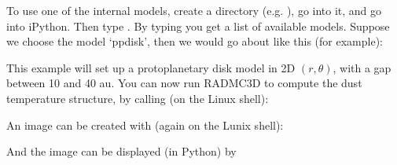 \documentclass[letterpaper,10pt,english]{sphinxmanual}
\begin{document}
To use one of the \sphinxhyphen{}internal models, create a directory
(e.g. ), go into it, and go into iPython. Then type
. By typing  you get a list
of available models. Suppose we choose the model ‘ppdisk’, then we would go
about like this (for example):

\begin{sphinxVerbatim}[commandchars=\\\{\}]
   
     
\end{sphinxVerbatim}

This example will set up a protoplanetary disk model in 2\sphinxhyphen{}D \((r,\theta)\),
with a gap between 10 and 40 au. You can now run RADMC\sphinxhyphen{}3D to compute the dust
temperature structure, by calling (on the Linux shell):

\begin{sphinxVerbatim}[commandchars=\\\{\}]
 
\end{sphinxVerbatim}

An image can be created with (again on the Lunix shell):

\begin{sphinxVerbatim}[commandchars=\\\{\}]
     
\end{sphinxVerbatim}

And the image can be displayed (in Python) by
\end{document}
